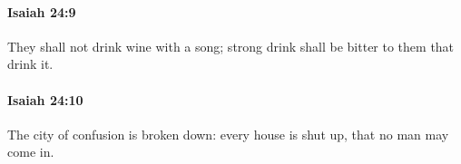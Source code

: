 		\paragraph{Isaiah 24:9} %
			\label{ISAIAH-24-9}

			They shall not drink wine with a song; strong drink shall be bitter to them that drink it.


		\paragraph{Isaiah 24:10} %
			\label{ISAIAH-24-10}

			The city of confusion is broken down: every house is shut up, that no man may come in.


